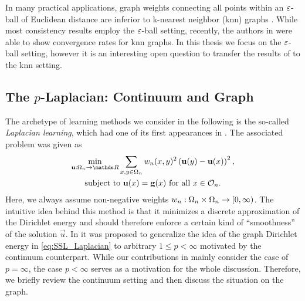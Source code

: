 %
%
%
\begin{remark}{}{}
In many practical applications, graph weights connecting all points within an $\varepsilon$-ball of Euclidean distance are inferior to k-nearest neighbor (knn) graphs \cite{calder2020poisson, flores2019algorithms, calder2022improved}. While most consistency results employ the $\varepsilon$-ball setting, recently, the authors in \cite{calder2022improved} were able to show convergence rates for knn graphs. In this thesis we focus on the $\varepsilon$-ball setting, however it is an interesting open question to transfer the results of \cite{roith2022continuum, bungert2021uniform, bungert2022ratio} to the knn setting.
\end{remark}
%
%
%
%
\subsection{The $p$-Laplacian: Continuum and Graph}\label{sec:pLap}
%
%
The archetype of learning methods we consider in the following is the so-called \emph{Laplacian learning}, which had one of its first appearances in 
\cite{zhu2003semi}. The associated problem was given as
%
\begin{gather}\label{eq:SSL_Laplacian}
\begin{gathered}
\min_{\vec u:\domain_n\to\R} \sum_{x,y\in\domain_n} w_n(x,y)^2 
\left(\vec u(y) - \vec u(x) \right)^2,\\
\text{subject to } \vec u(x) = \vec g(x) \text{ for all } x\in\conset_n.
\end{gathered}
\end{gather}
%
%
%
Here, we always assume non-negative weights $w_n:\Omega_n\times\Omega_n\to[0,\infty)$. The intuitive idea behind this method is that it minimizes a discrete approximation of the Dirichlet energy and should therefore enforce a certain kind of \enquote{smoothness} of the solution $\vec u$. In \cite{zhou2005regularization} it was proposed to generalize the idea of the graph Dirichlet energy in \cref{eq:SSL_Laplacian} to arbitrary $1\leq p < \infty$ motivated by the continuum counterpart. While our contributions in \cite{roith2022continuum, bungert2021uniform, bungert2022ratio} mainly consider the case of $p=\infty$, the case $p<\infty$ serves as a  motivation for the whole discussion. Therefore, we briefly review the continuum setting and then discuss the situation on the graph.
%
%
%
%

